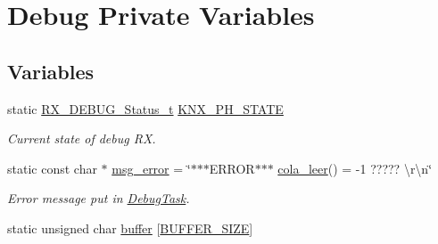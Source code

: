 \hypertarget{group___debug___private___variables}{}\section{Debug Private Variables}
\label{group___debug___private___variables}
\subsection*{Variables}
\begin{DoxyCompactItemize}
\item 
static \hyperlink{group___debug___exported___types_gabcec3ea567663bbefa0b9f7a88dd68f2}{R\+X\+\_\+\+D\+E\+B\+U\+G\+\_\+\+Status\+\_\+t} \hyperlink{group___debug___private___variables_ga65a0aa461c7b3901566170f888d0004c}{K\+N\+X\+\_\+\+P\+H\+\_\+\+S\+T\+A\+TE}\hypertarget{group___debug___private___variables_ga65a0aa461c7b3901566170f888d0004c}{}\label{group___debug___private___variables_ga65a0aa461c7b3901566170f888d0004c}

\begin{DoxyCompactList}\small\item\em Current state of debug RX. \end{DoxyCompactList}\item 
static const char $\ast$ \hyperlink{group___debug___private___variables_ga57ad017acd4535fe089f54ed903b3e9e}{msg\+\_\+error} = \char`\"{}$\ast$$\ast$$\ast$E\+R\+R\+OR$\ast$$\ast$$\ast$ \hyperlink{group___cola___exported___functions___group2_ga12fe948f259d8c9d7a390a76c416b55c}{cola\+\_\+leer}() = -\/1 ????? \textbackslash{}r\textbackslash{}n\char`\"{}\hypertarget{group___debug___private___variables_ga57ad017acd4535fe089f54ed903b3e9e}{}\label{group___debug___private___variables_ga57ad017acd4535fe089f54ed903b3e9e}

\begin{DoxyCompactList}\small\item\em Error message put in \hyperlink{group___debug___exported___functions___group2_ga0e7fca846e34e06a1f62249fe8a30a44}{Debug\+Task}. \end{DoxyCompactList}\item 
static unsigned char \hyperlink{group___debug___private___variables_gacab2203504e72e5e674d3174e0bd7d5e}{buffer} \mbox{[}\hyperlink{group___debug___private___define_ga6b20d41d6252e9871430c242cb1a56e7}{B\+U\+F\+F\+E\+R\+\_\+\+S\+I\+ZE}\mbox{]}\hypertarget{group___debug___private___variables_gacab2203504e72e5e674d3174e0bd7d5e}{}\label{group___debug___private___variables_gacab2203504e72e5e674d3174e0bd7d5e}


\end{DoxyCompactItemize}
